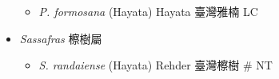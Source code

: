 \begin{itemize}
  \begin{itemize}
        \item[] \textit{P. formosana} (Hayata) Hayata  臺灣雅楠   LC
  \end{itemize}
 \item[] \textit{Sassafras} 檫樹屬
                                
  \begin{itemize}
        \item[] \textit{S. randaiense} (Hayata) Rehder  臺灣檫樹  \# NT
  \end{itemize}
  \end{itemize}
